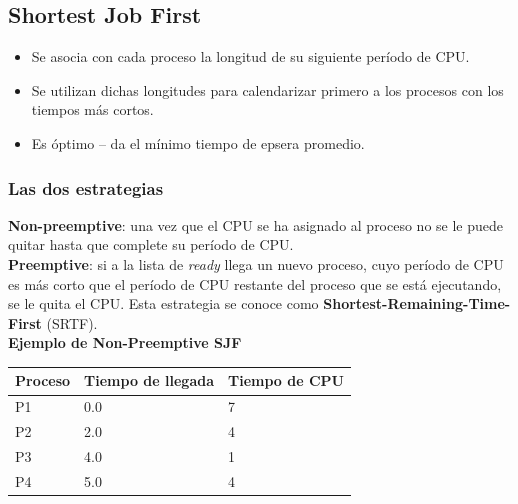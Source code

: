 \documentclass[a4paper, 11pt]{article}
\begin{document}
\subsection{Shortest Job First}
\begin{itemize}
    \item Se asocia con cada proceso la longitud de su siguiente período de CPU.
    \item Se utilizan dichas longitudes para calendarizar primero a los procesos con los tiempos más cortos.
    \item Es óptimo -- da el mínimo tiempo de epsera promedio.
\end{itemize}

\subsubsection{Las dos estrategias}
\textbf{Non-preemptive}: una vez que el CPU se ha asignado al proceso no se le puede quitar hasta que complete su período de CPU. \\

\textbf{Preemptive}: si a la lista de \textsl{ready} llega un nuevo proceso, cuyo período de CPU es más corto que el período de CPU restante del proceso que se está ejecutando, se le quita el CPU. Esta estrategia se conoce como \textbf{Shortest-Remaining-Time-First} (SRTF). \\

\textbf{Ejemplo de Non-Preemptive SJF} \\
\begin{tabular}{|l|l|l|}
    \hline 
    \textbf{Proceso} & \textbf{Tiempo de llegada} & \textbf{Tiempo de CPU} \\
    \hline
    P1 & 0.0 & 7 \\
    \hline
    P2 & 2.0 & 4 \\
    \hline
    P3 & 4.0 & 1 \\
    \hline
    P4 & 5.0 & 4 \\
    \hline
\end{tabular} \\

 \\
\end{document}
